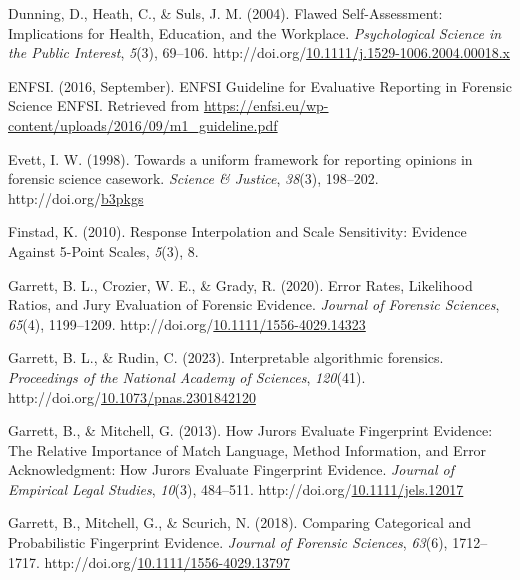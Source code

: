 \documentclass[print]{nuthesis}
\newlength{\cslhangindent}
\newenvironment{CSLReferences}[2]%
{\setlength{\parindent}{0pt}%
\everypar{\setlength{\hangindent}{\cslhangindent}}\ignorespaces}%
{\par}
\begin{document}
\begin{CSLReferences}{1}{0}
\leavevmode{}%
Dunning, D., Heath, C., \& Suls, J. M. (2004). Flawed {Self}-{Assessment}: {Implications} for {Health}, {Education}, and the {Workplace}. \emph{Psychological Science in the Public Interest}, \emph{5}(3), 69--106. http://doi.org/\href{https://doi.org/10.1111/j.1529-1006.2004.00018.x}{10.1111/j.1529-1006.2004.00018.x}

\leavevmode{}%
ENFSI. (2016, September). {ENFSI} {Guideline} for {Evaluative} {Reporting} in {Forensic} {Science} {\textbar} {ENFSI}. Retrieved from \url{https://enfsi.eu/wp-content/uploads/2016/09/m1_guideline.pdf}

\leavevmode{}%
Evett, I. W. (1998). Towards a uniform framework for reporting opinions in forensic science casework. \emph{Science \& Justice}, \emph{38}(3), 198--202. http://doi.org/\href{https://doi.org/b3pkgs}{b3pkgs}

\leavevmode{}%
Finstad, K. (2010). Response {Interpolation} and {Scale} {Sensitivity}: {Evidence} {Against} 5-{Point} {Scales}, \emph{5}(3), 8.

\leavevmode{}%
Garrett, B. L., Crozier, W. E., \& Grady, R. (2020). Error {Rates}, {Likelihood} {Ratios}, and {Jury} {Evaluation} of {Forensic} {Evidence}. \emph{Journal of Forensic Sciences}, \emph{65}(4), 1199--1209. http://doi.org/\href{https://doi.org/10.1111/1556-4029.14323}{10.1111/1556-4029.14323}

\leavevmode{}%
Garrett, B. L., \& Rudin, C. (2023). Interpretable algorithmic forensics. \emph{Proceedings of the National Academy of Sciences}, \emph{120}(41). http://doi.org/\href{https://doi.org/10.1073/pnas.2301842120}{10.1073/pnas.2301842120}

\leavevmode{}%
Garrett, B., \& Mitchell, G. (2013). How {Jurors} {Evaluate} {Fingerprint} {Evidence}: {The} {Relative} {Importance} of {Match} {Language}, {Method} {Information}, and {Error} {Acknowledgment}: {How} {Jurors} {Evaluate} {Fingerprint} {Evidence}. \emph{Journal of Empirical Legal Studies}, \emph{10}(3), 484--511. http://doi.org/\href{https://doi.org/10.1111/jels.12017}{10.1111/jels.12017}

\leavevmode{}%
Garrett, B., Mitchell, G., \& Scurich, N. (2018). Comparing {Categorical} and {Probabilistic} {Fingerprint} {Evidence}. \emph{Journal of Forensic Sciences}, \emph{63}(6), 1712--1717. http://doi.org/\href{https://doi.org/10.1111/1556-4029.13797}{10.1111/1556-4029.13797}


\end{CSLReferences}
\end{document}
